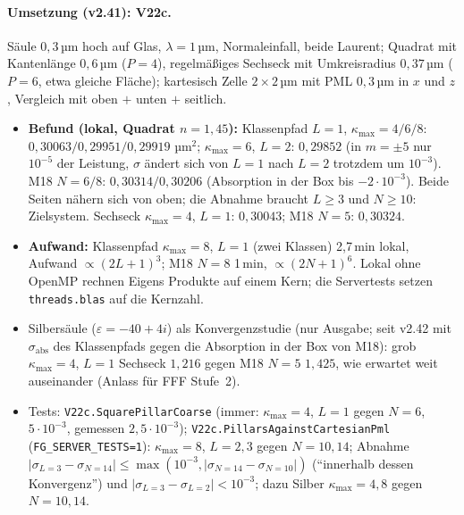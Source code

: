 \paragraph{Umsetzung (v2.41): V22c.}
Säule $0{,}3$\,µm hoch auf Glas, $\lambda=1$\,µm, Normaleinfall, beide Laurent; Quadrat mit Kantenlänge $0{,}6$\,µm
($P=4$), regelmäßiges Sechseck mit Umkreisradius $0{,}37$\,µm ($P=6$, etwa gleiche Fläche); kartesisch Zelle
$2\times2$\,µm mit PML $0{,}3$\,µm in $x$ und $z$, Vergleich mit oben $+$ unten $+$ seitlich.
\begin{itemize}[nosep]
  \item \textbf{Befund (lokal, Quadrat $n=1{,}45$):} Klassenpfad $L=1$, $\kappa_{\max}=4/6/8$: $0{,}30063/0{,}29951/0{,}29919$
        µm$^2$; $\kappa_{\max}=6$, $L=2$: $0{,}29852$ (in $m=\pm5$ nur $10^{-5}$ der Leistung, $\sigma$ ändert sich von $L=1$ nach $L=2$ trotzdem um
        $10^{-3}$). M18 $N=6/8$: $0{,}30314/0{,}30206$
        (Absorption in der Box bis $-2\cdot10^{-3}$). Beide Seiten nähern sich von oben; die Abnahme braucht $L\ge3$ und
        $N\ge10$: Zielsystem. Sechseck $\kappa_{\max}=4$, $L=1$: $0{,}30043$; M18 $N=5$: $0{,}30324$.
  \item \textbf{Aufwand:} Klassenpfad $\kappa_{\max}=8$, $L=1$ (zwei Klassen) 2{,}7\,min lokal, Aufwand $\propto(2L+1)^3$;
        M18 $N=8$ 1\,min, $\propto(2N+1)^6$. Lokal ohne OpenMP rechnen Eigens Produkte auf einem Kern; die Servertests
        setzen \verb|threads.blas| auf die Kernzahl.
  \item Silbersäule ($\varepsilon=-40+4i$) als Konvergenzstudie (nur Ausgabe; seit v2.42 mit $\sigma_{\text{abs}}$ des
        Klassenpfads gegen die Absorption in der Box von M18): grob $\kappa_{\max}=4$, $L=1$ Sechseck $1{,}216$ gegen M18 $N=5$ $1{,}425$, wie
        erwartet weit auseinander (Anlass für FFF Stufe~2).
  \item Tests: \verb|V22c.SquarePillarCoarse| (immer: $\kappa_{\max}=4$, $L=1$ gegen $N=6$, $5\cdot10^{-3}$, gemessen
        $2{,}5\cdot10^{-3}$); \verb|V22c.PillarsAgainstCartesianPml| (\verb|FG_SERVER_TESTS=1|): $\kappa_{\max}=8$,
        $L=2,3$ gegen $N=10,14$; Abnahme $|\sigma_{L=3}-\sigma_{N=14}|\le\max(10^{-3},|\sigma_{N=14}-\sigma_{N=10}|)$ (\enquote{innerhalb
        dessen Konvergenz}) und $|\sigma_{L=3}-\sigma_{L=2}|<10^{-3}$; dazu Silber $\kappa_{\max}=4,8$ gegen $N=10,14$.
\end{itemize}

